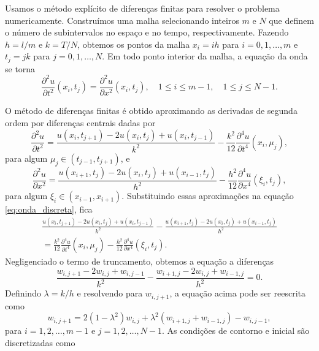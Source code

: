 \documentclass[11pt]{article}
\begin{document}
Usamos o método explícito de diferenças finitas para resolver o problema numericamente. Construímos uma malha selecionando inteiros \(m\) e \(N\) que definem o número de subintervalos no espaço e no tempo, respectivamente. Fazendo \(h = l/m\) e \(k = T/N\), obtemos os pontos da malha \(x_i = i h\) para \(i = 0, 1, \ldots, m\) e \(t_j = j k\) para \(j = 0, 1, \ldots, N\). Em todo ponto interior da malha, a equação da onda se torna
\begin{equation}\label{eq:onda_discreta}
    \frac{\partial^2 u}{\partial t^2}(x_i, t_j) = \frac{\partial^2 u}{\partial x^2}(x_i, t_j), \quad 1 \leq i \leq m-1, \quad 1 \leq j \leq N-1.
\end{equation}

O método de diferenças finitas é obtido aproximando as derivadas de segunda ordem por diferenças centrais dadas por
\begin{equation}
    \frac{\partial^2 u}{\partial t^2} = \frac{u(x_i, t_{j+1}) - 2u(x_i, t_j) + u(x_i, t_{j-1})}{k^2} - \frac{k^2}{12} \frac{\partial^4 u}{\partial t^4}(x_i, \mu_j),
\end{equation} para algum \(\mu_j \in (t_{j-1}, t_{j+1})\), e
\begin{equation}
    \frac{\partial^2 u}{\partial x^2} = \frac{u(x_{i+1}, t_j) - 2u(x_i, t_j) + u(x_{i-1}, t_j)}{h^2} - \frac{h^2}{12} \frac{\partial^4 u}{\partial x^4}(\xi_i, t_j),
\end{equation} para algum \(\xi_i \in (x_{i-1}, x_{i+1})\). Substituindo essas aproximações na equação \eqref{eq:onda_discreta}, fica
\begin{multline} \label{eq:solucao_erro}
    \frac{u(x_i, t_{j+1}) - 2u(x_i, t_j) + u(x_i, t_{j-1})}{k^2} - \frac{u(x_{i+1}, t_j) - 2u(x_i, t_j) + u(x_{i-1}, t_j)}{h^2} \\
    = \frac{k^2}{12} \frac{\partial^4 u}{\partial t^4}(x_i, \mu_j) - \frac{h^2}{12} \frac{\partial^4 u}{\partial x^4}(\xi_i, t_j).
\end{multline} Negligenciado o termo de truncamento, obtemos a equação a diferenças
\begin{equation}
    \frac{w_{i, j+1} - 2w_{i, j} + w_{i, j-1}}{k^2} - \frac{w_{i+1, j} - 2w_{i, j} + w_{i-1, j}}{h^2} = 0.
\end{equation} Definindo \(\lambda = k/h\) e resolvendo para \(w_{i, j+1}\), a equação acima pode ser reescrita como
\begin{equation}\label{eq:solucao_diferencas_finitas}
    w_{i, j+1} = 2(1 - \lambda^2) w_{i, j} + \lambda^2 (w_{i+1, j} + w_{i-1, j}) - w_{i, j-1},
\end{equation} para \(i = 1, 2, \ldots, m-1\) e \(j = 1, 2, \ldots, N-1\). As condições de contorno e inicial são discretizadas como
\end{document}
